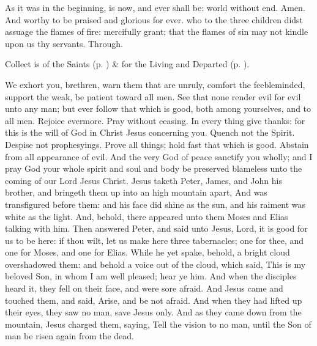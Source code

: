 As it was in the beginning, is now, and ever shall be: world without end. Amen. And worthy to be praised and glorious for ever.
{} who to the three children didst assuage the flames of fire: mercifully grant; that the flames of sin may not kindle upon us thy servants. Through.
\begin{rubric}
     Collect is of the Saints (p. \pageref{SPSaints}) \&  for the Living and Departed (p. \pageref{SPLivingDeparted}).
\end{rubric}
 We exhort you, brethren, warn them that are unruly, comfort the feebleminded, support the weak, be patient toward all men. See that none render evil for evil unto any man; but ever follow that which is good, both among yourselves, and to all men. Rejoice evermore. Pray without ceasing. In every thing give thanks: for this is the will of God in Christ Jesus concerning you. Quench not the Spirit. Despise not prophesyings. Prove all things; hold fast that which is good. Abstain from all appearance of evil. And the very God of peace sanctify you wholly; and I pray God your whole spirit and soul and body be preserved blameless unto the coming of our Lord Jesus Christ.
 Jesus taketh Peter, James, and John his brother, and bringeth them up into an high mountain apart, And was transfigured before them: and his face did shine as the sun, and his raiment was white as the light. And, behold, there appeared unto them Moses and Elias talking with him. Then answered Peter, and said unto Jesus, Lord, it is good for us to be here: if thou wilt, let us make here three tabernacles; one for thee, and one for Moses, and one for Elias. While he yet spake, behold, a bright cloud overshadowed them: and behold a voice out of the cloud, which said, This is my beloved Son, in whom I am well pleased; hear ye him. And when the disciples heard it, they fell on their face, and were sore afraid. And Jesus came and touched them, and said, Arise, and be not afraid. And when they had lifted up their eyes, they saw no man, save Jesus only. And as they came down from the mountain, Jesus charged them, saying, Tell the vision to no man, until the Son of man be risen again from the dead.
